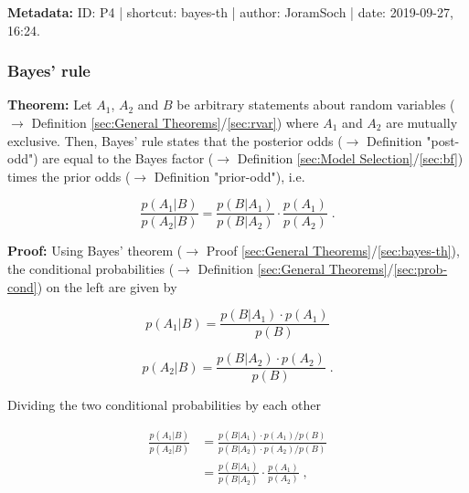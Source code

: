 \documentclass[a4paper,12pt,twoside]{book}
\begin{document}
\vspace{1em}
\textbf{Metadata:} ID: P4 | shortcut: bayes-th | author: JoramSoch | date: 2019-09-27, 16:24.
\vspace{1em}



\subsubsection[\textbf{Bayes' rule}]{Bayes' rule} \label{sec:bayes-rule}
\setcounter{equation}{0}

\textbf{Theorem:} Let $A_1$, $A_2$ and $B$ be arbitrary statements about random variables ($\rightarrow$ Definition \ref{sec:General Theorems}/\ref{sec:rvar}) where $A_1$ and $A_2$ are mutually exclusive. Then, Bayes' rule states that the posterior odds ($\rightarrow$ Definition "post-odd") are equal to the Bayes factor ($\rightarrow$ Definition \ref{sec:Model Selection}/\ref{sec:bf}) times the prior odds ($\rightarrow$ Definition "prior-odd"), i.e.

\begin{equation} \label{eq:bayes-rule-bayes-rule}
\frac{p(A_1|B)}{p(A_2|B)} = \frac{p(B|A_1)}{p(B|A_2)} \cdot \frac{p(A_1)}{p(A_2)} \; .
\end{equation}


\vspace{1em}
\textbf{Proof:} Using Bayes' theorem ($\rightarrow$ Proof \ref{sec:General Theorems}/\ref{sec:bayes-th}), the conditional probabilities ($\rightarrow$ Definition \ref{sec:General Theorems}/\ref{sec:prob-cond}) on the left are given by

\begin{equation} \label{eq:bayes-rule-bayes-th-A1}
p(A_1|B) = \frac{p(B|A_1) \cdot p(A_1)}{p(B)}
\end{equation}

\begin{equation} \label{eq:bayes-rule-bayes-th-A2}
p(A_2|B) = \frac{p(B|A_2) \cdot p(A_2)}{p(B)} \; .
\end{equation}

Dividing the two conditional probabilities by each other

\begin{equation} \label{eq:bayes-rule-bayes-rule-qed}
\begin{split}
\frac{p(A_1|B)}{p(A_2|B)} &= \frac{p(B|A_1) \cdot p(A_1) / p(B)}{p(B|A_2) \cdot p(A_2) / p(B)} \\
&= \frac{p(B|A_1)}{p(B|A_2)} \cdot \frac{p(A_1)}{p(A_2)} \; ,
\end{split}
\end{equation}
\end{document}
